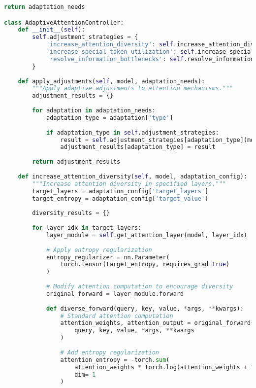 \begin{lstlisting}[language=Python, caption=Attention pattern analysis and optimization framework]
        return adaptation_needs

class AdaptiveAttentionController:
    def __init__(self):
        self.adjustment_strategies = {
            'increase_attention_diversity': self.increase_attention_diversity,
            'increase_special_token_utilization': self.increase_special_token_utilization,
            'resolve_information_bottlenecks': self.resolve_information_bottlenecks
        }
    
    def apply_adjustments(self, model, adaptation_needs):
        """Apply adaptive adjustments to attention mechanisms."""
        adjustment_results = {}
        
        for adaptation in adaptation_needs:
            adaptation_type = adaptation['type']
            
            if adaptation_type in self.adjustment_strategies:
                result = self.adjustment_strategies[adaptation_type](model, adaptation)
                adjustment_results[adaptation_type] = result
        
        return adjustment_results
    
    def increase_attention_diversity(self, model, adaptation_config):
        """Increase attention diversity in specified layers."""
        target_layers = adaptation_config['target_layers']
        target_entropy = adaptation_config['target_value']
        
        diversity_results = {}
        
        for layer_idx in target_layers:
            layer_module = self.get_attention_layer(model, layer_idx)
            
            # Apply entropy regularization
            entropy_regularizer = nn.Parameter(
                torch.tensor(target_entropy, requires_grad=True)
            )
            
            # Modify attention computation to encourage diversity
            original_forward = layer_module.forward
            
            def diverse_forward(query, key, value, *args, **kwargs):
                # Standard attention computation
                attention_weights, attention_output = original_forward(
                    query, key, value, *args, **kwargs
                )
                
                # Add entropy regularization
                attention_entropy = -torch.sum(
                    attention_weights * torch.log(attention_weights + 1e-8),
                    dim=-1
                )
                

\end{lstlisting}
